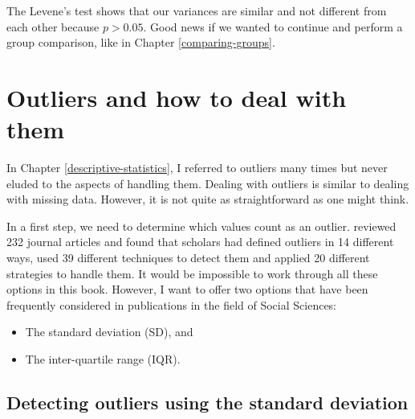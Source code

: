 \documentclass[
]{book}
\newenvironment{Shaded}{\begin{snugshade}}{\end{snugshade}}
\newcommand{\DocumentationTok}[1]{\textcolor[rgb]{0.56,0.35,0.01}{\textbf{\textit{#1}}}}
\newcommand{\FunctionTok}[1]{\textcolor[rgb]{0.00,0.00,0.00}{#1}}
\newcommand{\NormalTok}[1]{#1}
\newcommand{\SpecialCharTok}[1]{\textcolor[rgb]{0.00,0.00,0.00}{#1}}
\begin{document}
\begin{Shaded}
\end{Shaded}

The Levene's test shows that our variances are similar and not different from each other because \(p > 0.05\). Good news if we wanted to continue and perform a group comparison, like in Chapter \ref{comparing-groups}.

\hypertarget{dealing-with-outliers}{%
\section{Outliers and how to deal with them}\label{dealing-with-outliers}}

In Chapter \ref{descriptive-statistics}, I referred to outliers many times but never eluded to the aspects of handling them. Dealing with outliers is similar to dealing with missing data. However, it is not quite as straightforward as one might think.

In a first step, we need to determine which values count as an outlier. \citet{aguinis2013best} reviewed 232 journal articles and found that scholars had defined outliers in 14 different ways, used 39 different techniques to detect them and applied 20 different strategies to handle them. It would be impossible to work through all these options in this book. However, I want to offer two options that have been frequently considered in publications in the field of Social Sciences:

\begin{itemize}
\item
  The standard deviation (SD), and
\item
  The inter-quartile range (IQR).
\end{itemize}

\hypertarget{ouliers-standard_deviation}{%
\subsection{Detecting outliers using the standard deviation}\label{ouliers-standard_deviation}}
\end{document}
